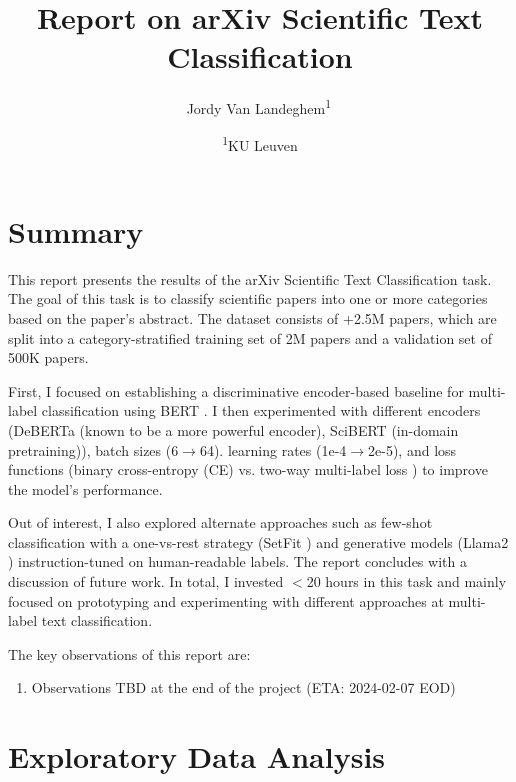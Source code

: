 \documentclass[11pt,letterpaper]{article}
\begin{document}
\title{Report on arXiv Scientific Text Classification} %

\newcommand{\superaffil}[2]{\textsuperscript{#1}\,#2}

\author{
  \small Jordy Van Landeghem\superaffil{1}
  \and
  \footnotesize{
    \textsuperscript{1}KU Leuven
  }
}

\maketitle

\section{Summary}

This report presents the results of the arXiv Scientific Text Classification task. The goal of this task is to classify scientific papers into one or more categories based on the paper's abstract. The dataset consists of +2.5M papers, which are split into a category-stratified training set of 2M papers and a validation set of 500K papers.

First, I focused on establishing a discriminative encoder-based baseline for multi-label classification using BERT \cite{devlin2018bert}.
I then experimented with different encoders (DeBERTa \cite{he2020deberta} (known to be a more powerful encoder), SciBERT \cite{maheshwari2021scibert} (in-domain pretraining)), batch sizes (6$\to$64). learning rates (1e-4$\to$2e-5), and loss functions (binary cross-entropy (CE) vs. two-way multi-label loss \cite{kobayashi2023two}) to improve the model's performance.

Out of interest, I also explored alternate approaches such as few-shot classification with a one-vs-rest strategy (SetFit \cite{tunstall2022efficient}) and generative models (Llama2 \cite{touvron2023llama}) instruction-tuned on human-readable labels. The report concludes with a discussion of future work. In total, I invested $<$20 hours in this task and mainly focused on prototyping and experimenting with different approaches at multi-label text classification.

\noindent The key observations of this report are:
\begin{enumerate}
  [label=\Roman*.,leftmargin=2\parindent]
  \item  Observations TBD at the end of the project (ETA: 2024-02-07 EOD)
\end{enumerate}

\section{Exploratory Data Analysis}
\end{document}
